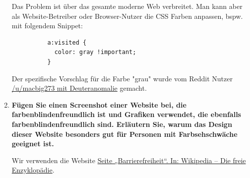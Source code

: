 \documentclass[a4paper,12pt]{article}
\begin{document}
\begin{enumerate}[label=\alph*)]
        Das Problem ist über das gesamte moderne Web verbreitet. Man kann aber als Website-Betreiber
        oder Browser-Nutzer die CSS Farben anpassen, bspw. mit folgendem Snippet:

        \begin{verbatim}
          a:visited {
            color: gray !important;
          }
        \end{verbatim}

        Der spezifische Vorschlag für die Farbe "grau" wurde vom Reddit Nutzer
        \href{https://www.reddit.com/r/ColorBlind/comments/n35ht1/bad_website_examples/gwnzs4w/}{/u/macbig273 mit Deuteranomalie} gemacht.
  \item \textbf{Fügen Sie einen Screenshot einer Website bei, die farbenblindenfreundlich ist
          und Grafiken verwendet, die ebenfalls farbenblindenfreundlich sind. Erläutern
          Sie, warum das Design dieser Website besonders gut für Personen mit
          Farbsehschwäche geeignet ist.}

        Wir verwenden die Website \href{https://de.wikipedia.org/wiki/Barrierefreiheit}{Seite „Barrierefreiheit“. In: Wikipedia – Die freie Enzyklopädie}.


\end{enumerate}
\end{document}
